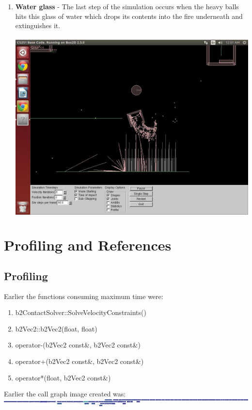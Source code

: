 \documentclass{report}
\begin{document}
\begin{enumerate}
\item \textbf{Water glass} - The last step of the simulation occurs when the heavy balls hits this glass of water which drops its contents into the fire underneath and extinguishes it.\\\\
\includegraphics[scale=0.25]{pics/WaterGlassAndFire(extinguished)}

\end{enumerate}
\pagebreak

\chapter{Profiling and References}
\section{Profiling}
Earlier the functions consuming maximum time were:
\begin{enumerate}
\item b2ContactSolver::SolveVelocityConstraints()
\item b2Vec2::b2Vec2(float, float)
\item operator-(b2Vec2 const\&, b2Vec2 const\&)
\item operator+(b2Vec2 const\&, b2Vec2 const\&)
\item operator*(float, b2Vec2 const\&)
\end{enumerate}
Earlier the call graph image created was:\\
\includegraphics[scale=0.05]{performanceold}\\
\end{document}
